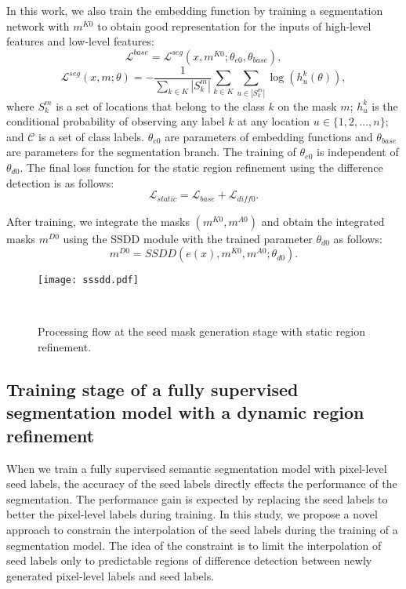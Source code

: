 \documentclass[10pt,twocolumn,letterpaper]{article}
\begin{document}
In this work, we also train the embedding function by training a segmentation network with $m^{K0}$ to obtain good representation for the inputs of high-level features and low-level features:
\begin{equation}
{\mathcal L}^{base}={\mathcal L}^{seg}(x,m^{K0};\theta_{e0},\theta_{base}),
\end{equation}
\begin{equation}
{\mathcal L}^{seg}(x,m;\theta)=-\frac{1}{\displaystyle{\sum_{k\in K} |S_{k}^{m}|}} \displaystyle{\sum_{k\in K}}\displaystyle{\sum_{u \in |S_{k}^{m}|}}\log(h_{u}^{k}(\theta)),
\end{equation}
where $S_{k}^{m}$ is a set of locations that belong to the class $k$ on the mask $m$; $h_{u}^{k}$ is the conditional probability of observing any label $k$ at any location $u \in \{1, 2, . . . , n\}$; and ${\mathcal C}$ is a set of class labels.
$\theta_{e0}$ are parameters of embedding functions and $\theta_{base}$ are parameters for the segmentation branch. 
The training of $\theta_{e0}$ is independent of $\theta_{d0}$.
The final loss function for the static region refinement using the difference detection is as follows:
\begin{equation}
{\mathcal L}_{static}={\mathcal L}_{base}+{\mathcal L}_{\mathit{diff0}}.
\end{equation}

After training, we integrate the masks  $(m^{K0},m^{A0})$ and obtain the integrated masks $m^{D0}$ using the SSDD module with the trained parameter $\theta_{d0}$ as follows:
\begin{equation}
 m^{D0} = SSDD(e(x), m^{K0},m^{A0};\theta_{d0}).
\end{equation}
\begin{figure}[tb]
\begin{center}
\texttt{[image: sssdd.pdf]}
\caption{Processing flow at the seed mask generation stage with static region refinement.} \label{fig_sssdd}
\vskip -5mm~
\end{center}
\end{figure}

\subsection{Training stage of a fully supervised segmentation model with a dynamic region refinement \label{dynamic}}
When we train a fully supervised semantic segmentation model with pixel-level seed labels,
the accuracy of the seed labels directly effects the performance of the segmentation.
The performance gain is expected by replacing the seed labels to better the pixel-level labels during training.
In this study, we propose a novel approach to constrain the interpolation of the seed labels during the training of a segmentation model.
The idea of the constraint is to limit the interpolation of seed labels only to predictable regions of difference detection between newly generated pixel-level labels and seed labels.
\end{document}
